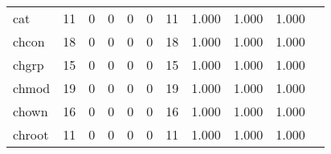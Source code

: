 \begin{longtable}{lp{1.20cm}p{1.20cm}p{1.20cm}p{1.20cm}p{1.20cm}p{1.20cm}p{1.20cm}p{1.20cm}p{1.20cm}p{1.20cm}}
cat       &                                    11 &                                                  0 &                                                  0 &                                                  0 &                                                  0 &                                                 11 &                                         1.000 &                                              1.000 &                                              1.000 \\
chcon     &                                    18 &                                                  0 &                                                  0 &                                                  0 &                                                  0 &                                                 18 &                                         1.000 &                                              1.000 &                                              1.000 \\
chgrp     &                                    15 &                                                  0 &                                                  0 &                                                  0 &                                                  0 &                                                 15 &                                         1.000 &                                              1.000 &                                              1.000 \\
chmod     &                                    19 &                                                  0 &                                                  0 &                                                  0 &                                                  0 &                                                 19 &                                         1.000 &                                              1.000 &                                              1.000 \\
chown     &                                    16 &                                                  0 &                                                  0 &                                                  0 &                                                  0 &                                                 16 &                                         1.000 &                                              1.000 &                                              1.000 \\
chroot    &                                    11 &                                                  0 &                                                  0 &                                                  0 &                                                  0 &                                                 11 &                                         1.000 &                                              1.000 &                                              1.000 \\

\end{longtable}
